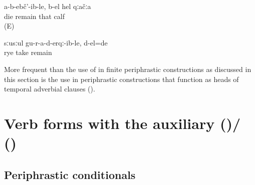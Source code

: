 \begin{exe}
	\ex	\label{ex:The calf, not having died, is alive b-el}
	\gll	a-b-ebč'-ib-le,	b-el	hel	qːačːa\\
		die	remain	that	calf\\
	\glt	{} (E)
	
	\ex	\label{ex:The rye was still not taken to Icari (it was left untaken) b-el}
	\gll	sːusːul	gu-r-a-d-erqː-ib-le,	d-el=de	\\
		rye	take	remain	\\
	\glt	{}
\end{exe}



More frequent than the use of  in finite periphrastic constructions as discussed in this section is the use in periphrastic constructions that function as heads of temporal adverbial clauses ().



\section[Verb forms with the auxiliary \protect\tit{b-irχʷ-} (\protect\tsc{ipfv})/\protect\tit{b-iχʷ-} (\protect\tsc{pfv})]{Verb forms with the auxiliary \protect{} (\protect{})/\protect{} (\protect{}) \protect{}}
\label{sec:Verb forms with the auxiliary b-irxw- (ipfv) / b-ixw- (pfv) be, become, be able}



\subsection{Periphrastic conditionals}
\label{ssec:Periphrastic conditionals}

